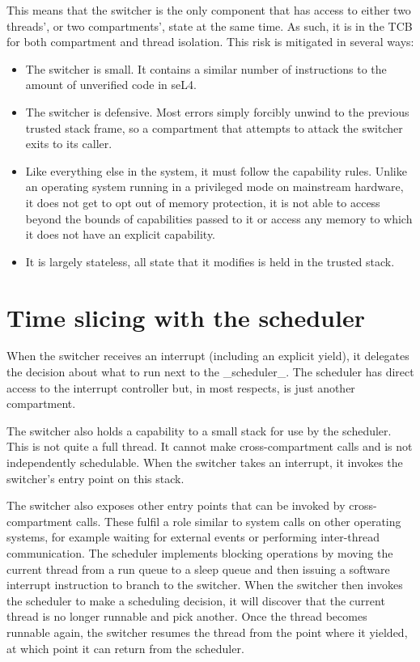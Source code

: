 This means that the switcher is the only component that has access to either two threads', or two compartments', state at the same time.
As such, it is in the TCB for both compartment and thread isolation.
This risk is mitigated in several ways:

\begin{itemize}
	\item{The switcher is small.
		It contains a similar number of instructions to the amount of unverified code in seL4.}
	\item{The switcher is defensive.
		Most errors simply forcibly unwind to the previous trusted stack frame, so a compartment that attempts to attack the switcher exits to its caller.}
	\item{Like everything else in the system, it must follow the capability rules.
		Unlike an operating system running in a privileged mode on mainstream hardware, it does not get to opt out of memory protection, it is not able to access beyond the bounds of capabilities passed to it or access any memory to which it does not have an explicit capability.}
	\item{It is largely stateless, all state that it modifies is held in the trusted stack.}
\end{itemize}

\section{Time slicing with the scheduler}

When the switcher receives an interrupt (including an explicit yield), it delegates the decision about what to run next to the _scheduler_.
The scheduler has direct access to the interrupt controller but, in most respects, is just another compartment.

The switcher also holds a capability to a small stack for use by the scheduler.
This is not quite a full thread.
It cannot make cross-compartment calls and is not independently schedulable.
When the switcher takes an interrupt, it invokes the switcher's entry point on this stack.

The switcher also exposes other entry points that can be invoked by cross-compartment calls.
These fulfil a role similar to system calls on other operating systems, for example waiting for external events or performing inter-thread communication.
The scheduler implements blocking operations by moving the current thread from a run queue to a sleep queue and then issuing a software interrupt instruction to branch to the switcher.
When the switcher then invokes the scheduler to make a scheduling decision, it will discover that the current thread is no longer runnable and pick another.
Once the thread becomes runnable again, the switcher resumes the thread from the point where it yielded, at which point it can return from the scheduler.

